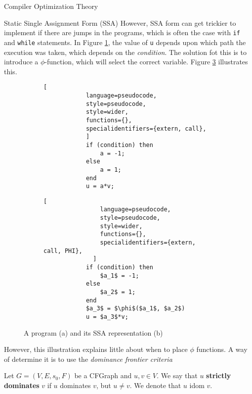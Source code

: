 \begin{section}{Compiler Optimization Theory}
\begin{subsection}{Static Single Assignment Form (SSA)}
However, SSA form can get trickier to implement if there are jumps in the
programs, which is often the case with \texttt{if} and \texttt{while}
statements. In Figure \ref{fig:code_normal}, the value of \texttt{u}
depends upon which path the execution was taken, which depends on the
\textit{condition}. The solution fot this is to introduce a $\phi$-function,
which will select the correct variable. Figure \ref{fig:code_ssa_form}
illustrates this.

\begin{figure}[ht]
    \centering
    \begin{subfigure}[b]{0.40\textwidth}

        \begin{lstlisting}[
            language=pseudocode,
            style=pseudocode,
            style=wider,
            functions={},
            specialidentifiers={extern, call},
            ]
            if (condition) then
                a = -1;
            else
                a = 1;
            end
            u = a*v;
        \end{lstlisting}
        \caption{\label{fig:code_normal}}
    \end{subfigure}
    \begin{subfigure}[b]{0.40\textwidth}
        \begin{lstlisting}[
                language=pseudocode,
                style=pseudocode,
                style=wider,
                functions={},
                specialidentifiers={extern, call, PHI},
              ]
            if (condition) then
                $a_1$ = -1;
            else
                $a_2$ = 1;
            end
            $a_3$ = $\phi$($a_1$, $a_2$)
            u = $a_3$*v;
        \end{lstlisting}
        \caption{\label{fig:code_ssa_form}}
\end{subfigure}
\caption{A program (a) and its SSA representation (b)}
\end{figure}

However, this illustration explains little about when to
place $\phi$ functions. A way of determine it is to use
the \textit{dominance frontier criteria}

\begin{definition}
	Let $G = (V, E, s_0, F)$ be a CFGraph and $u, v \in V$. We say that
	$u$ \textbf{strictly dominates} $v$ if $u$ dominates $v$, but
	$u \neq v$. We denote that $u$ idom $v$.
\end{definition}


\end{subsection}
\end{section}
